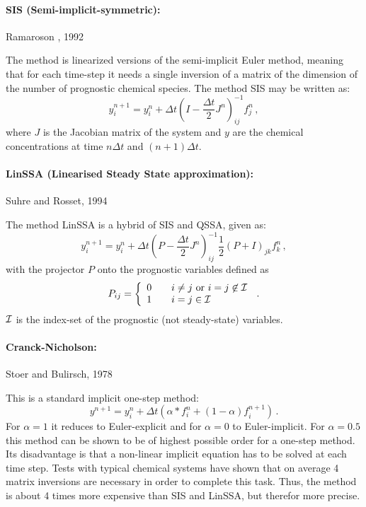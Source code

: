 \paragraph*{SIS (Semi-implicit-symmetric):} Ramaroson \etal, 1992
\par\noindent
The method is linearized versions of the semi-implicit Euler method,
meaning that for each time-step it needs a single inversion of a matrix
of the dimension of the number of prognostic chemical species.
The method SIS may be written as:
\begin{equation}
y_i^{n+1} = y_i^n + \Delta t\left({I}
          - \frac{\Delta t}2 {J}^n\right)_{ij}^{-1}f_j^n \,,
\end{equation}
where $J$ is the Jacobian matrix of the system and
$y$ are the chemical concentrations at time $n\Delta t$
and $(n+1)\Delta t$.

\paragraph*{LinSSA (Linearised Steady State approximation):}
Suhre and Rosset, 1994
\par\noindent
The method LinSSA is a hybrid of SIS and QSSA, given as:
\begin{equation}
y_i^{n+1} = y_i^n + \Delta t\left({P}
          - \frac{\Delta t}2 {J}^n\right)_{ij}^{-1}
          \frac12({P}+{I})_{jk}f_k^n \,,
\end{equation}
with the projector ${P}$ onto the prognostic variables defined as
\begin{equation}
P_{ij} =
\left\{
  \begin{array}{ll}
    0\quad&i\ne j\,\, \hbox{\rm or}\,\, i=j\not\in {\cal I}\cr
    1\quad&i=j\in {\cal I}\cr
  \end{array}
\right.  \,.
\end{equation}
$\cal I$ is the index-set of the prognostic (not steady-state) variables.

\paragraph*{Cranck-Nicholson:} Stoer and Bulirsch, 1978
\par\noindent
This is a standard implicit one-step method:
\begin{equation}
y^{n+1} = y_i^n + \Delta t\left( 
                      \alpha * f_i^n  + (1-\alpha) f_i^{n+1}\right)
\,.
\end{equation}
For $\alpha=1$ it reduces to Euler-explicit and for $\alpha=0$ to 
Euler-implicit. For $\alpha=0.5$ this method can be shown to be of
highest possible order for a one-step method.
Its disadvantage is that a non-linear implicit equation has to
be solved at each time step. Tests with typical chemical systems
have shown that on average 4 matrix inversions are necessary in order
to complete this task. Thus, the method is about 4 times more expensive
than SIS and LinSSA, but therefor more precise.


